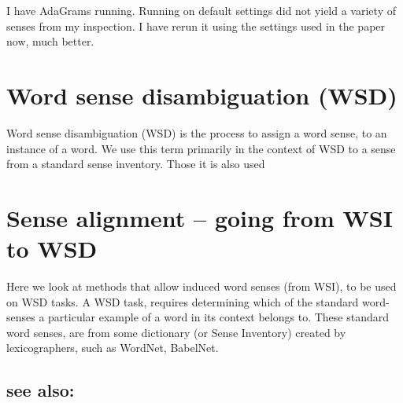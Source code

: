 \documentclass{article}
\begin{document}


I have AdaGrams running. Running on default settings did not yield a variety of senses from my inspection. I have rerun it using the settings used in the paper now, much better.



\section{Word sense disambiguation (WSD)}
Word sense disambiguation (WSD) is the process to assign a word sense, to an instance of a word. We use this term primarily in the context of WSD to a sense from a standard sense inventory. Those it is also used 


\section{Sense alignment -- going from WSI to WSD}
Here we look at methods that allow induced word senses (from WSI), to be used on WSD tasks.
A WSD task, requires determining which of the standard word-senses a particular example of a word in its context belongs to.
These standard word senses, are from some dictionary (or Sense Inventory) created by lexicographers, such as WordNet, BabelNet.



\subsection{see also:}
\end{document}
